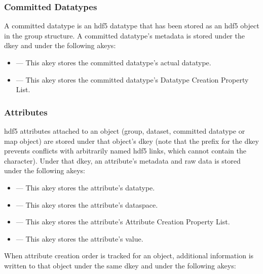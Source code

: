 \documentclass[../design_doc.tex]{subfiles}
\begin{document}
\subsubsection{Committed Datatypes}

A committed datatype is an \acrshort{hdf5} datatype that has been stored as an \acrshort{hdf5} object in the group structure. A committed datatype's metadata is stored under the  \gls{dkey} and under the following \glspl{akey}:

\begin{itemize}
    \item {} --- This \gls{akey} stores the committed datatype's actual datatype.
    \item {} --- This \gls{akey} stores the committed datatype's Datatype Creation Property List.
\end{itemize}


\newpage

\subsubsection{Attributes}

\acrshort{hdf5} attributes attached to an object (group, dataset, committed datatype or map object) are stored under that object's  \gls{dkey} (note that the \mintcinline{/} prefix for the  \gls{dkey} prevents conflicts with arbitrarily named \acrshort{hdf5} links, which cannot contain the \mintcinline{/} character). Under that \gls{dkey}, an attribute's metadata and raw data is stored under the following \glspl{akey}:

\begin{itemize}
    \item {} --- This \gls{akey} stores the attribute's datatype.
    \item {} --- This \gls{akey} stores the attribute's dataspace.
    \item {} --- This \gls{akey} stores the attribute's Attribute Creation Property List.
    \item {} --- This \gls{akey} stores the attribute's value.
\end{itemize}

When attribute creation order is tracked for an object, additional information is written to that object under the same  \gls{dkey} and under the following \glspl{akey}:
\end{document}
